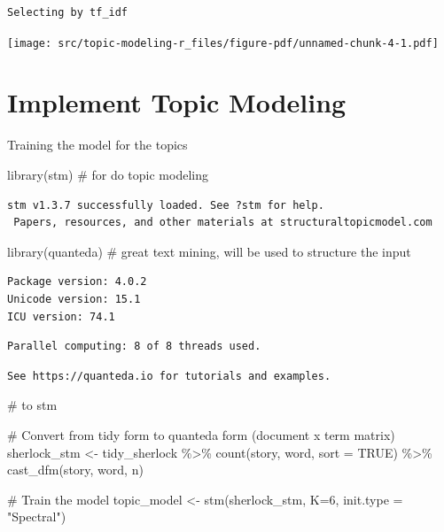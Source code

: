 \documentclass[
  letterpaper,
  DIV=11,
  numbers=noendperiod]{scrreprt}
\newenvironment{Shaded}{\begin{snugshade}}{\end{snugshade}}
\newcommand{\AttributeTok}[1]{\textcolor[rgb]{0.40,0.45,0.13}{#1}}
\newcommand{\CommentTok}[1]{\textcolor[rgb]{0.37,0.37,0.37}{#1}}
\newcommand{\ConstantTok}[1]{\textcolor[rgb]{0.56,0.35,0.01}{#1}}
\newcommand{\DecValTok}[1]{\textcolor[rgb]{0.68,0.00,0.00}{#1}}
\newcommand{\FunctionTok}[1]{\textcolor[rgb]{0.28,0.35,0.67}{#1}}
\newcommand{\NormalTok}[1]{\textcolor[rgb]{0.00,0.23,0.31}{#1}}
\newcommand{\OtherTok}[1]{\textcolor[rgb]{0.00,0.23,0.31}{#1}}
\newcommand{\SpecialCharTok}[1]{\textcolor[rgb]{0.37,0.37,0.37}{#1}}
\newcommand{\StringTok}[1]{\textcolor[rgb]{0.13,0.47,0.30}{#1}}
\begin{document}
\begin{verbatim}
Selecting by tf_idf
\end{verbatim}

\texttt{[image: src/topic-modeling-r\_files/figure-pdf/unnamed-chunk-4-1.pdf]}

\chapter{Implement Topic Modeling}\label{implement-topic-modeling}

Training the model for the topics

\begin{Shaded}
\begin{Highlighting}[]
\FunctionTok{library}\NormalTok{(stm)        }\CommentTok{\# for do topic modeling}
\end{Highlighting}
\end{Shaded}

\begin{verbatim}
stm v1.3.7 successfully loaded. See ?stm for help. 
 Papers, resources, and other materials at structuraltopicmodel.com
\end{verbatim}

\begin{Shaded}
\begin{Highlighting}[]
\FunctionTok{library}\NormalTok{(quanteda)   }\CommentTok{\# great text mining, will be used to structure the input}
\end{Highlighting}
\end{Shaded}

\begin{verbatim}
Package version: 4.0.2
Unicode version: 15.1
ICU version: 74.1
\end{verbatim}

\begin{verbatim}
Parallel computing: 8 of 8 threads used.
\end{verbatim}

\begin{verbatim}
See https://quanteda.io for tutorials and examples.
\end{verbatim}

\begin{Shaded}
\begin{Highlighting}[]
                    \CommentTok{\#   to stm}

\CommentTok{\# Convert from tidy form to quanteda form (document x term matrix)}
\NormalTok{sherlock\_stm }\OtherTok{\textless{}{-}}\NormalTok{ tidy\_sherlock }\SpecialCharTok{\%\textgreater{}\%} 
  \FunctionTok{count}\NormalTok{(story, word, }\AttributeTok{sort =} \ConstantTok{TRUE}\NormalTok{) }\SpecialCharTok{\%\textgreater{}\%} 
  \FunctionTok{cast\_dfm}\NormalTok{(story, word, n)}

\CommentTok{\# Train the model}
\NormalTok{topic\_model }\OtherTok{\textless{}{-}} \FunctionTok{stm}\NormalTok{(sherlock\_stm, }\AttributeTok{K=}\DecValTok{6}\NormalTok{, }\AttributeTok{init.type =} \StringTok{"Spectral"}\NormalTok{)}
\end{Highlighting}
\end{Shaded}
\end{document}
